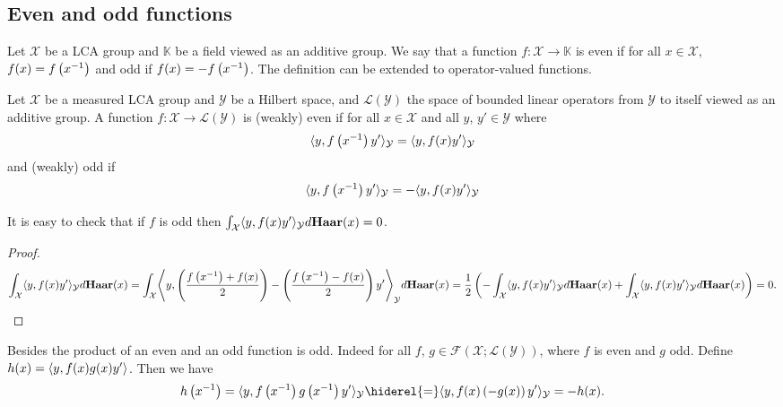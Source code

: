 \subsection{Even and odd functions}
Let $\mathcal{X}$ be a \ac{LCA} group and $\mathbb{K}$ be a field viewed as an additive group. We say that a function $f:\mathcal{X}\to\mathbb{K}$ is even if for all $x\in\mathcal{X}$, $f(x)=f\left({x}^{-1}\right)$ and odd if $f(x)=-f\left({x}^{-1}\right)$. The definition can be extended to operator-valued functions.
\begin{definition}
Let $\mathcal{X}$ be a measured \ac{LCA} group and $\mathcal{Y}$ be a Hilbert space, and $\mathcal{L}(\mathcal{Y})$ the space of bounded linear operators from $\mathcal{Y}$ to itself viewed as an additive group. A function $f:\mathcal{X}\to\mathcal{L}(\mathcal{Y})$ is (weakly) even if for all $x\in\mathcal{X}$ and all $y$, $y'\in\mathcal{Y}$ where $\mathcal{}$
\begin{dmath}
\inner{y,f\left(\inv{x}\right)y'}_{\mathcal{Y}}=\inner{y,f(x)y'}_{\mathcal{Y}}
\end{dmath}
and (weakly) odd if
\begin{dmath}
\inner{y,f\left(\inv{x}\right)y'}_{\mathcal{Y}}=-\inner{y,f(x)y'}_{\mathcal{Y}}
\end{dmath}
\end{definition}
It is easy to check that if $f$ is odd then $\int_{\mathcal{X}}\langle y,f(x)y'\rangle_{\mathcal{Y}}d\mathbf{Haar}(x)=0$.
\begin{proof}
\begin{dmath*}
\int_{\mathcal{X}}\inner{y,f(x)y'}_{\mathcal{Y}}d\Haar(x)=\int_{\mathcal{X}}\inner*{y,\left(\frac{f\left(\inv{x}\right) + f(x)}{2}\right)-\left(\frac{f\left(\inv{x}\right) - f(x)}{2}\right)y'}_{\mathcal{Y}}d\Haar(x)
=\frac{1}{2}\left(-\int_{\mathcal{X}}\inner{y,f(x)y'}_{\mathcal{Y}}d\Haar(x) + \int_{\mathcal{X}}\inner{y,f(x)y'}_{\mathcal{Y}}d\Haar(x)\right)
=0.
\end{dmath*}
\end{proof}
Besides the product of an even and an odd function is odd. Indeed for all $f$, $g\in\mathcal{F}(\mathcal{X};\mathcal{L}(\mathcal{Y}))$, where $f$ is even and $g$ odd. Define $h(x)=\langle y,f(x)g(x)y'\rangle$. Then we have
\begin{dmath}
h\left(\inv{x}\right)=\inner{y,f\left(\inv{x}\right)g\left(\inv{x}\right)y'}_{\mathcal{Y}}
\hiderel{=}\inner{y,f(x)\left(-g(x)\right)y'}_{\mathcal{Y}}
=-h(x).
\end{dmath}
